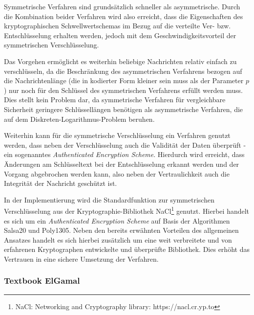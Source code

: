   Symmetrische Verfahren sind grundsätzlich schneller als asymmetrische. Durch die Kombination beider Verfahren wird also erreicht, dass die Eigenschaften des kryptographischen Schwellwertschemas im Bezug auf die verteilte Ver- bzw. Entschlüsselung erhalten werden, jedoch mit dem Geschwindigkeitsvorteil der symmetrischen Verschlüsselung. 
  
  Das Vorgehen ermöglicht es weiterhin beliebige Nachrichten relativ einfach zu verschlüsseln, da die Beschränkung des asymmetrischen Verfahrens bezogen auf die Nachrichtenlänge (die in kodierter Form kleiner sein muss als der Parameter \(p\)) nur noch für den Schlüssel des symmetrischen Verfahrens erfüllt werden muss. Dies stellt kein Problem dar, da symmetrische Verfahren für vergleichbare Sicherheit geringere Schlüssellängen benötigen als asymmetrische Verfahren, die auf dem Diskreten-Logarithmus-Problem beruhen.
  
  Weiterhin kann für die symmetrische Verschlüsselung ein Verfahren genutzt werden, dass neben der Verschlüsselung auch die Validität der Daten überprüft - ein sogenanntes \textit{Authenticated Encryption Scheme}. Hierdurch wird erreicht, dass Änderungen am Schlüsseltext bei der Entschlüsselung erkannt werden und der Vorgang abgebrochen werden kann, also neben der Vertraulichkeit auch die Integrität der Nachricht geschützt ist. 
  
  In der Implementierung wird die Standardfunktion zur symmetrischen Verschlüsselung aus der Kryptographie-Bibliothek NaCl\footnote{
    NaCl: Networking and Cryptography library: https://nacl.cr.yp.to
  } 
  genutzt. Hierbei handelt es sich um ein \textit{Authenticated Encryption Scheme} auf Basis der Algorithmen Salsa20 und Poly1305. Neben den bereits erwähnten Vorteilen des allgemeinen Ansatzes handelt es sich hierbei zusätzlich um eine weit verbreitete und von erfahrenen Kryptographen entwickelte und überprüfte Bibliothek. Dies erhöht das Vertrauen in eine sichere Umsetzung der Verfahren.
  

  \subsubsection{Textbook ElGamal}
  
